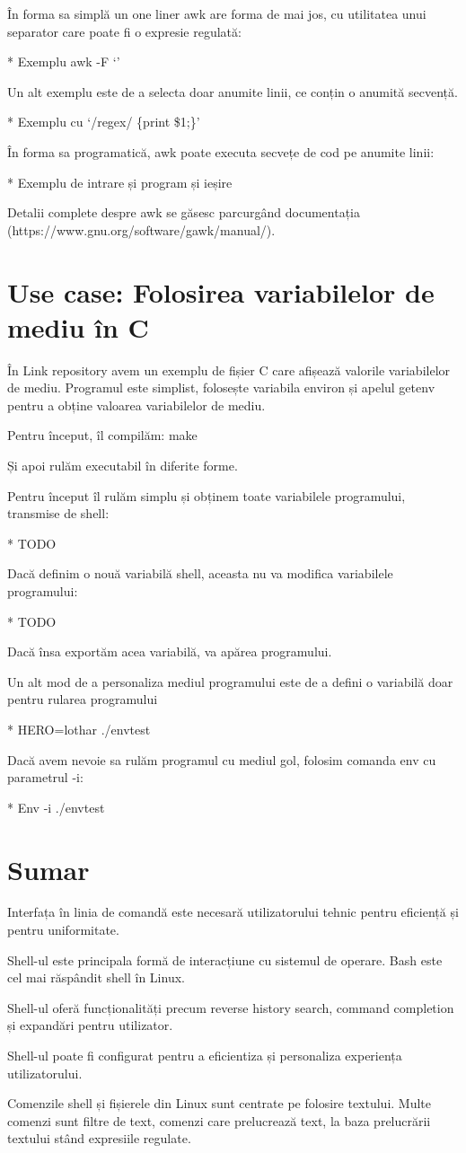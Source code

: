 În forma sa simplă un one liner awk are forma de mai jos, cu utilitatea unui
separator care poate fi o expresie regulată:

* Exemplu awk -F ‘’

Un alt exemplu este de a selecta doar anumite linii, ce conțin o anumită
secvență.

* Exemplu cu ‘/regex/ \{print \$1;\}’

În forma sa programatică, awk poate executa secvețe de cod pe anumite linii:

* Exemplu de intrare și program și ieșire

Detalii complete despre awk se găsesc parcurgând documentația
(https://www.gnu.org/software/gawk/manual/).

\section{Use case: Folosirea variabilelor de mediu în C}
\label{sec:cli-c-env-vars}

În Link repository avem un exemplu de fișier C care afișează valorile
variabilelor de mediu. Programul este simplist, folosește variabila environ și
apelul getenv pentru a obține valoarea variabilelor de mediu.

Pentru început, îl compilăm: make

Și apoi rulăm executabil în diferite forme.

Pentru început îl rulăm simplu și obținem toate variabilele programului, transmise de shell:

* TODO

Dacă definim o nouă variabilă shell, aceasta nu va modifica variabilele programului:

* TODO

Dacă însa exportăm acea variabilă, va apărea programului.

Un alt mod de a personaliza mediul programului este de a defini o variabilă doar pentru rularea programului

* HERO=lothar ./envtest

Dacă avem nevoie sa rulăm programul cu mediul gol, folosim comanda env cu parametrul -i:

* Env -i ./envtest

\section{Sumar}
\label{sec:cli-summary}

Interfața în linia de comandă este necesară utilizatorului tehnic pentru eficiență și pentru uniformitate.

Shell-ul este principala formă de interacțiune cu sistemul de operare. Bash este cel mai răspândit shell în Linux.

Shell-ul oferă funcționalități precum reverse history search, command completion și expandări pentru utilizator.

Shell-ul poate fi configurat pentru a eficientiza și personaliza experiența utilizatorului.

Comenzile shell și fișierele din Linux sunt centrate pe folosire textului. Multe
comenzi sunt filtre de text, comenzi care prelucrează text, la baza prelucrării
textului stând expresiile regulate.
